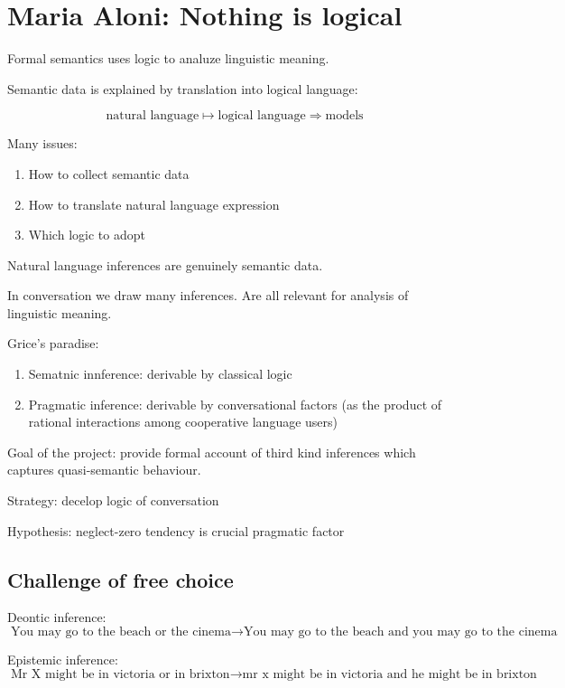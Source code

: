\section{Maria Aloni: Nothing is logical}

Formal semantics uses logic to analuze linguistic meaning.

Semantic data is explained by translation into logical language:

\[
    \text{natural language} \mapsto \text{logical language} \Rightarrow \text{models}
\]

Many issues:
\begin{enumerate}
    \item How to collect semantic data
    \item How to translate natural language expression
    \item Which logic to adopt
\end{enumerate}

Natural language inferences are genuinely semantic data.

In conversation we draw many inferences. Are all relevant for analysis of
linguistic meaning.

Grice's paradise:
\begin{enumerate}
    \item Sematnic innference: derivable by classical logic
    \item Pragmatic inference: derivable by conversational factors (as the
          product of rational interactions among cooperative language users)
\end{enumerate}

Goal of the project: provide formal account of third kind inferences which
captures quasi-semantic behaviour.

Strategy: decelop logic of conversation

Hypothesis: neglect-zero tendency is crucial pragmatic factor

\subsection{Challenge of free choice}

Deontic inference:
\[
    \text{You may go to the beach or the cinema}\to\text{You may go to the beach and you may go to the cinema}
\]

Epistemic inference:
\[
    \text{Mr X might be in victoria or in brixton}\to\text{mr x might be in victoria and he might be in brixton}
\]

